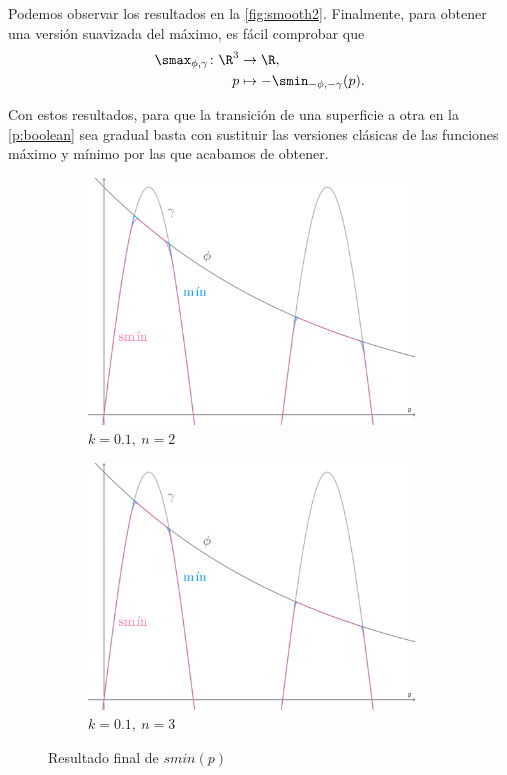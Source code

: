 Podemos observar los resultados en la \autoref{fig:smooth2}. Finalmente, para obtener una versión suavizada del máximo, es fácil comprobar que 
\begin{align*}
      \smax_{\phi,\gamma}\colon \R^3&\to \R,\\
      p &\mapsto -\smin_{-\phi,-\gamma}(p).
\end{align*}

Con estos resultados, para que la transición de una superficie a otra en la \autoref{p:boolean} sea gradual basta con sustituir las versiones clásicas de las funciones máximo y mínimo por las que acabamos de obtener.  
\begin{figure}[!h]
     \begin{subfigure}[b]{0.49\linewidth}
        \centering
        \includegraphics[width=0.95\textwidth]{Plantilla-TFG-master/img/smin_3.png}
        \caption{$k=0.1,\ n=2$}
     \end{subfigure}
     \begin{subfigure}[b]{0.49\linewidth}
        \centering
        \includegraphics[width=0.95\textwidth]{Plantilla-TFG-master/img/smin_4.png}
        \caption{$k=0.1,\ n=3$}
     \end{subfigure}
     \caption{Resultado final de $smin(p)$ }
     \label{fig:smooth2}
\end{figure}





